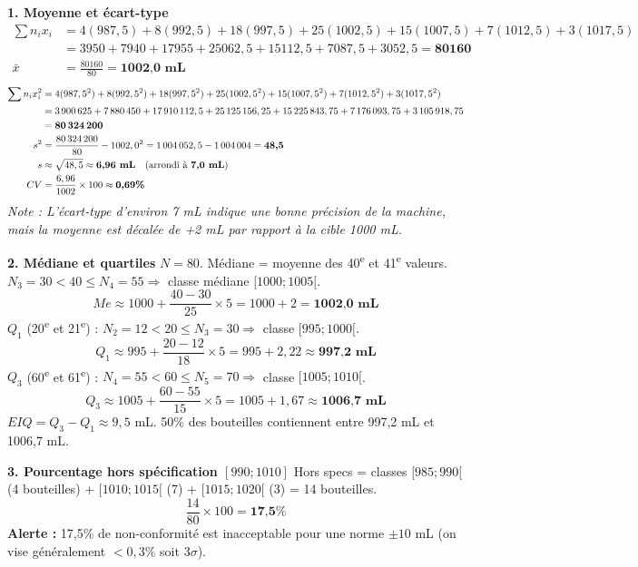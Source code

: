 \documentclass[11pt]{article}
\begin{document}
\begin{exoresolu}
\textbf{1. Moyenne et écart-type}
\begin{align*}
\sum n_i x_i &= 4(987,5) + 8(992,5) + 18(997,5) + 25(1002,5) + 15(1007,5) + 7(1012,5) + 3(1017,5) \\
&= 3950 + 7940 + 17955 + 25062,5 + 15112,5 + 7087,5 + 3052,5 = \textbf{80160} \\
\bar{x} &= \frac{80160}{80} = \textbf{1002,0 mL}
\end{align*}
\begin{align*}
\sum n_i x_i^2 &= 4(987,5^2) + 8(992,5^2) + 18(997,5^2) + 25(1002,5^2) + 15(1007,5^2) + 7(1012,5^2) + 3(1017,5^2) \\
&= 3\,900\,625 + 7\,880\,450 + 17\,910\,112,5 + 25\,125\,156,25 + 15\,225\,843,75 + 7\,176\,093,75 + 3\,105\,918,75 \\
&= \textbf{80\,324\,200} \\
s^2 &= \frac{80\,324\,200}{80} - 1002,0^2 = 1\,004\,052,5 - 1\,004\,004 = \textbf{48,5} \\
s &\approx \sqrt{48,5} \approx \textbf{6,96 mL} \quad (\text{arrondi à } \textbf{7,0 mL}) \\
CV &= \frac{6,96}{1002} \times 100 \approx \textbf{0,69\%}
\end{align*}
\textit{Note : L'écart-type d'environ 7 mL indique une bonne précision de la machine, mais la moyenne est décalée de +2 mL par rapport à la cible 1000 mL.}

\textbf{2. Médiane et quartiles}
$N=80$. Médiane = moyenne des 40\textsuperscript{e} et 41\textsuperscript{e} valeurs. $N_{3}=30 < 40 \le N_{4}=55 \Rightarrow$ classe médiane $[1000; 1005[$.
\[
Me \approx 1000 + \frac{40 - 30}{25} \times 5 = 1000 + 2 = \textbf{1002,0 mL}
\]
$Q_1$ (20\textsuperscript{e} et 21\textsuperscript{e}) : $N_{2}=12 < 20 \le N_{3}=30 \Rightarrow$ classe $[995; 1000[$.
\[
Q_1 \approx 995 + \frac{20 - 12}{18} \times 5 = 995 + 2,22 \approx \textbf{997,2 mL}
\]
$Q_3$ (60\textsuperscript{e} et 61\textsuperscript{e}) : $N_{4}=55 < 60 \le N_{5}=70 \Rightarrow$ classe $[1005; 1010[$.
\[
Q_3 \approx 1005 + \frac{60 - 55}{15} \times 5 = 1005 + 1,67 \approx \textbf{1006,7 mL}
\]
$EIQ = Q_3 - Q_1 \approx 9,5$ mL. 50\% des bouteilles contiennent entre 997,2 mL et 1006,7 mL.

\textbf{3. Pourcentage hors spécification $[990; 1010]$}
Hors specs = classes $[985;990[$ (4 bouteilles) + $[1010;1015[$ (7) + $[1015;1020[$ (3) = 14 bouteilles.
\[
\frac{14}{80} \times 100 = \textbf{17,5\%}
\]
\textbf{Alerte :} 17,5\% de non-conformité est inacceptable pour une norme $\pm 10$ mL (on vise généralement $< 0,3\%$ soit $3\sigma$).


\end{exoresolu}
\end{document}
